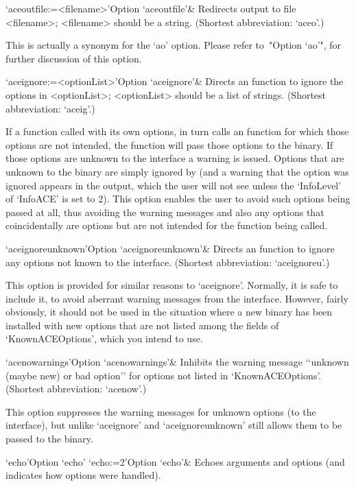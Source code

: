 \>`aceoutfile:=<filename>'{Option `aceoutfile'}&
Redirects {\ACE} output to file <filename>;  <filename>  should  be  a
string. (Shortest abbreviation: `aceo'.)

This  is  actually  a  synonym  for  the  `ao'  option.  Please  refer
to~"Option `ao'", for further discussion of this option.

\>`aceignore:=<optionList>'{Option `aceignore'}&
Directs an {\ACE} function to  ignore  the  options  in  <optionList>;
<optionList> should be a list of strings.
(Shortest abbreviation: `aceig'.)

If a function called with its own options, in  turn  calls  an  {\ACE}
function for which those options are not intended, the {\ACE} function
will pass those options to the {\ACE} binary.  If  those  options  are
unknown to the {\ACE} interface a warning is issued. Options that  are
unknown to the {\ACE} binary are  simply  ignored  by  {\ACE}  (and  a
warning that the option was ignored  appears  in  the  {\ACE}  output,
which the user will not see unless the `InfoLevel' of `InfoACE' is set
to 2). This option enables the user to avoid such options being passed
at all, thus avoiding the warning messages and also any  options  that
coincidentally are {\ACE} options but are not intended for the  {\ACE}
function being called.

\>`aceignoreunknown'{Option `aceignoreunknown'}&
Directs an {\ACE} function to  ignore  any  options  not known to the
{\ACE} interface.
(Shortest abbreviation: `aceignoreu'.)

This option is provided for similar reasons to `aceignore'.  Normally,
it is safe to include it, to avoid aberrant warning messages from  the
{\ACE} interface. However, fairly obviously, it should not be used  in
the situation where a new {\ACE} binary has been  installed  with  new
options that are not listed among  the  fields  of  `KnownACEOptions',
which you intend to use.

\>`acenowarnings'{Option `acenowarnings'}& 
Inhibits the warning message \lq{}`unknown (maybe new) or bad option''
for options not listed in `KnownACEOptions'.
(Shortest abbreviation: `acenow'.)

This option suppresses the warning messages for  unknown  options  (to
the {\ACE} interface), but unlike `aceignore'  and  `aceignoreunknown'
still allows them to be passed to the {\ACE} binary.

\>`echo'{Option `echo'} 
\>`echo:=2'{Option `echo'}& 
Echoes arguments and options (and indicates how options were handled).

